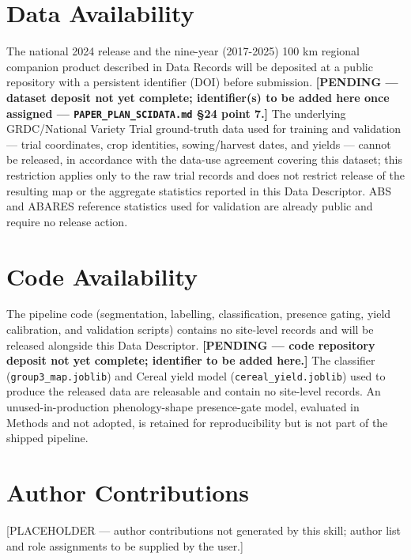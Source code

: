 
\section*{Data Availability}\label{data-availability}

The national 2024 release and the nine-year (2017-2025) 100 km regional companion product described in Data Records will be deposited at a public repository with a persistent identifier (DOI) before submission. \textbf{{[}PENDING --- dataset deposit not yet complete; identifier(s) to be added here once assigned --- \texttt{PAPER\_PLAN\_SCIDATA.md} \S24 point 7.{]}} The underlying GRDC/National Variety Trial ground-truth data used for training and validation --- trial coordinates, crop identities, sowing/harvest dates, and yields --- cannot be released, in accordance with the data-use agreement covering this dataset; this restriction applies only to the raw trial records and does not restrict release of the resulting map or the aggregate statistics reported in this Data Descriptor. ABS and ABARES reference statistics used for validation are already public and require no release action.

\section*{Code Availability}\label{code-availability}

The pipeline code (segmentation, labelling, classification, presence gating, yield calibration, and validation scripts) contains no site-level records and will be released alongside this Data Descriptor. \textbf{{[}PENDING --- code repository deposit not yet complete; identifier to be added here.{]}} The classifier (\texttt{group3\_map.joblib}) and Cereal yield model (\texttt{cereal\_yield.joblib}) used to produce the released data are releasable and contain no site-level records. An unused-in-production phenology-shape presence-gate model, evaluated in Methods and not adopted, is retained for reproducibility but is not part of the shipped pipeline.

\section*{Author Contributions}\label{author-contributions}

{[}PLACEHOLDER --- author contributions not generated by this skill; author list and role assignments to be supplied by the user.{]}

